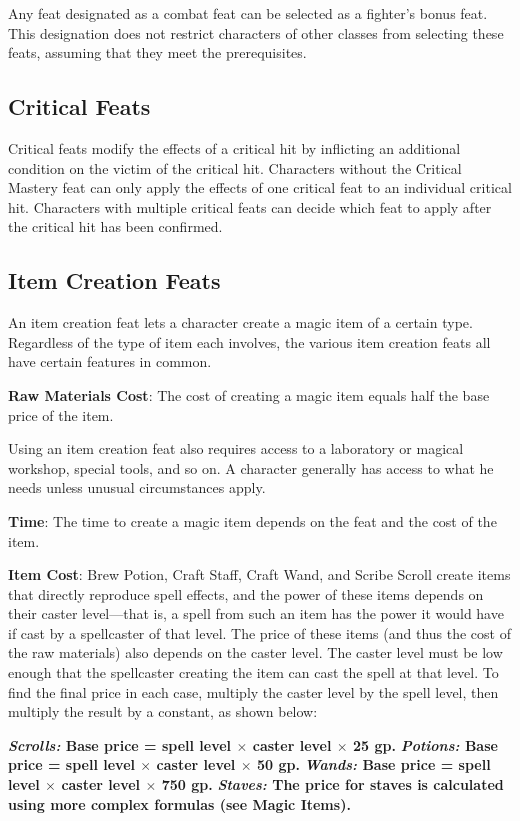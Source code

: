 				
Any feat designated as a combat feat can be selected as a fighter's bonus feat. This designation does not restrict characters of other classes from selecting these feats, assuming that they meet the prerequisites.
				
\subsection{Critical Feats}

				
Critical feats modify the effects of a critical hit by inflicting an additional condition on the victim of the critical hit. Characters without the Critical Mastery feat can only apply the effects of one critical feat to an individual critical hit. Characters with multiple critical feats can decide which feat to apply after the critical hit has been confirmed.
								
\subsection{Item Creation Feats}

				
An item creation feat lets a character create a magic item of a certain type. Regardless of the type of item each involves, the various item creation feats all have certain features in common.
				
\textbf{Raw Materials Cost}: The cost of creating a magic item equals half the base price of the item.
				
Using an item creation feat also requires access to a laboratory or magical workshop, special tools, and so on. A character generally has access to what he needs unless unusual circumstances apply.
				
\textbf{Time}: The time to create a magic item depends on the feat and the cost of the item.
				
\textbf{Item Cost}: Brew Potion, Craft Staff, Craft Wand, and Scribe Scroll create items that directly reproduce spell effects, and the power of these items depends on their caster level---that is, a spell from such an item has the power it would have if cast by a spellcaster of that level. The price of these items (and thus the cost of the raw materials) also depends on the caster level. The caster level must be low enough that the spellcaster creating the item can cast the spell at that level. To find the final price in each case, multiply the caster level by the spell level, then multiply the result by a constant, as shown below:

\textbf{\textit{Scrolls:} Base price = spell level \mbox{$\times$} caster level \mbox{$\times$} 25 gp.}\newline
\textbf{\textit{Potions:} Base price = spell level \mbox{$\times$} caster level \mbox{$\times$} 50 gp.}\newline
\textbf{\textit{Wands:} Base price = spell level \mbox{$\times$} caster level \mbox{$\times$} 750 gp.}\newline
\textbf{\textit{Staves:} The price for staves is calculated using more complex formulas (see Magic Items).}
				

